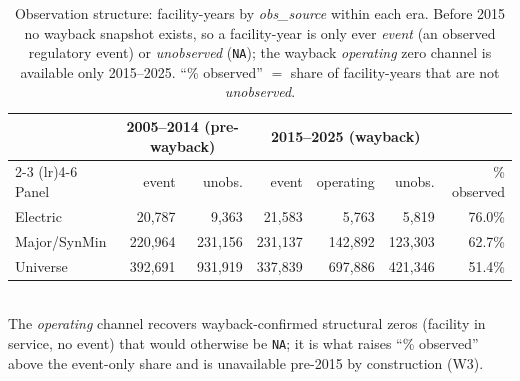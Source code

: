 \begin{table}[htbp]
\centering
\small
\caption{Observation structure: facility-years by \emph{obs\_source} within each era. Before 2015 no wayback snapshot exists, so a facility-year is only ever \emph{event} (an observed regulatory event) or \emph{unobserved} (\texttt{NA}); the wayback \emph{operating} zero channel is available only 2015--2025. ``\% observed'' $=$ share of facility-years that are not \emph{unobserved}.}
\label{tab:obs_structure}
\begin{tabular}{lrr rrr r}
\toprule
  & \multicolumn{2}{c}{2005--2014 (pre-wayback)} & \multicolumn{3}{c}{2015--2025 (wayback)} &   \\
\cmidrule(lr){2-3} \cmidrule(lr){4-6}
Panel & event & unobs. & event & operating & unobs. & \% observed \\
\midrule
Electric & 20,787 & 9,363 & 21,583 & 5,763 & 5,819 & 76.0\% \\
Major/SynMin & 220,964 & 231,156 & 231,137 & 142,892 & 123,303 & 62.7\% \\
Universe & 392,691 & 931,919 & 337,839 & 697,886 & 421,346 & 51.4\% \\
\bottomrule
\end{tabular}
\\[2pt]
{\footnotesize The \emph{operating} channel recovers wayback-confirmed structural zeros (facility in service, no event) that would otherwise be \texttt{NA}; it is what raises ``\% observed'' above the event-only share and is unavailable pre-2015 by construction (W3).}
\end{table}

